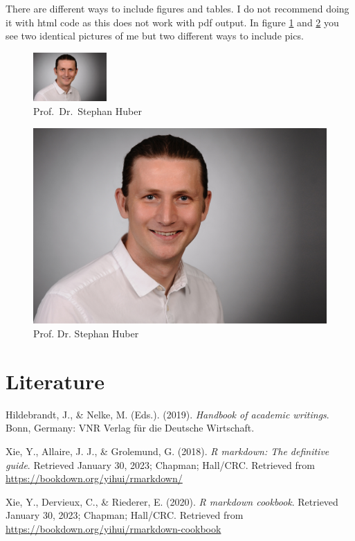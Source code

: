 \documentclass[
  12pt,
]{article}
\newlength{\cslhangindent}
\newlength{\cslentryspacingunit} %
\newenvironment{CSLReferences}[2] %
 {%
  \setlength{\parindent}{0pt}
  \ifodd #1
  \let\oldpar\par
  \def\par{\hangindent=\cslhangindent\oldpar}
  \fi
  \setlength{\parskip}{#2\cslentryspacingunit}
 }%
 {}
\begin{document}
There are different ways to include figures and tables. I do not recommend doing it with html code as this does not work with pdf output. In figure \ref{fig:itsme} and \ref{fig:figofme} you see two identical pictures of me but two different ways to include pics.

\begin{figure}
\centering
\includegraphics[width=0.25\textwidth,height=\textheight]{../pic/huber2.jpeg}
\caption[\label{fig:itsme} Prof.~Dr.~Stephan Huber]{\label{fig:itsme} Prof.~Dr.~Stephan Huber\footnotemark{}}
\end{figure}

\begin{figure}

{\centering \includegraphics[width=0.2\linewidth]{../pic/huber2} 

}

\caption{Prof. Dr. Stephan Huber}\label{fig:figofme}
\end{figure}

\hypertarget{literature}{%
\section*{Literature}\label{literature}}

\hypertarget{refs}{}
\begin{CSLReferences}{1}{0}
\leavevmode{}%
Hildebrandt, J., \& Nelke, M. (Eds.). (2019). \emph{Handbook of academic writings}. Bonn, Germany: VNR Verlag f{ü}r die Deutsche Wirtschaft.

\leavevmode{}%
Xie, Y., Allaire, J. J., \& Grolemund, G. (2018). \emph{R markdown: The definitive guide}. Retrieved January 30, 2023; Chapman; Hall/CRC. Retrieved from \url{https://bookdown.org/yihui/rmarkdown/}

\leavevmode{}%
Xie, Y., Dervieux, C., \& Riederer, E. (2020). \emph{R markdown cookbook}. Retrieved January 30, 2023; Chapman; Hall/CRC. Retrieved from \url{https://bookdown.org/yihui/rmarkdown-cookbook}

\end{CSLReferences}
\end{document}
